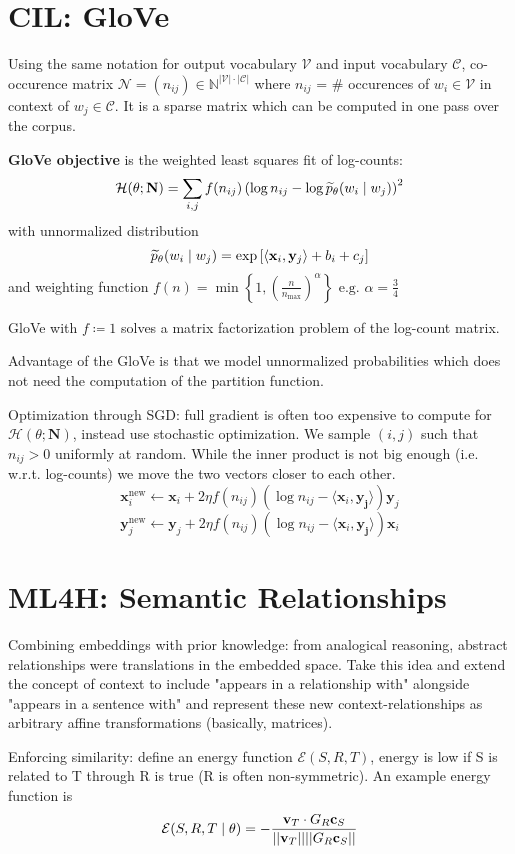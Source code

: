 \documentclass[12pt]{article}
\begin{document}
\section{CIL: GloVe}
\par Using the same notation for output vocabulary $\mathcal{V}$ and input vocabulary $\mathcal{C}$, co-occurence matrix $\mathcal{N} = (n_{ij})\in \mathbb{N}^{|\mathcal{V}|\cdot|\mathcal{C}|}$ where $n_{ij}$ = \# occurences of $w_i\in\mathcal{V}$ in context of $w_j\in\mathcal{C}$. It is a sparse matrix which can be computed in one pass over the corpus.
\par \textbf{GloVe objective} is the weighted least squares fit of log-counts:
\[ \mathcal{H}(\theta;\mathbf{N}) = \sum_{i,j} f(n_{ij}) \left( \log n_{ij} - \log \widetilde{p}_{\theta} (w_i\mid w_j) \right)^2 \]
with unnormalized distribution
\[ \widetilde{p}_{\theta} (w_i\mid w_j) = \exp\left[ \left\langle \mathbf{x}_i,\mathbf{y}_j \right\rangle + b_i + c_j \right] \]
and weighting function $f(n) = \min \left\{ 1, \left( \frac{n}{n_{\max}} \right)^{\alpha}  \right\} \text{ e.g. } \alpha = \frac{3}{4}  $
\par GloVe with $f\coloneqq 1$ solves a matrix factorization problem of the log-count matrix.
\par Advantage of the GloVe is that we model unnormalized probabilities which does not need the computation of the partition function.
\par Optimization through SGD: full gradient is often too expensive to compute for $\mathcal{H}(\theta;\mathbf{N})$, instead use stochastic optimization. We sample $(i,j)$ such that $n_{ij} > 0$ uniformly at random. While the inner product is not big enough (i.e. w.r.t. log-counts) we move the two vectors closer to each other.
\[ \mathbf{x}_i^{\text{new}} \leftarrow \mathbf{x}_i + 2\eta f(n_{ij})(\log n_{ij} - \langle \mathbf{x}_i , \mathbf{y_j} \rangle) \mathbf{y}_j \]
\[ \mathbf{y}_j^{\text{new}} \leftarrow \mathbf{y}_j + 2\eta f(n_{ij})(\log n_{ij} - \langle \mathbf{x}_i , \mathbf{y_j} \rangle) \mathbf{x}_i \]

\section{ML4H: Semantic Relationships}
\par Combining embeddings with prior knowledge: from analogical reasoning, abstract relationships were translations in the embedded space. Take this idea and extend the concept of context to include "appears in a relationship with" alongside "appears in a sentence with" and represent these new context-relationships as arbitrary affine transformations (basically, matrices).
\par Enforcing similarity: define an energy function $\mathcal{E} (S,R,T)$, energy is low if S is related to T through R is true (R is often non-symmetric). An example  energy function is $$\mathcal{E} (S,R,T \mid \theta) = -\frac{\mathbf{v}_T \cdot G_R \mathbf{c}_S}{||\mathbf{v}_T||||G_R \mathbf{c}_S||}$$
\end{document}
